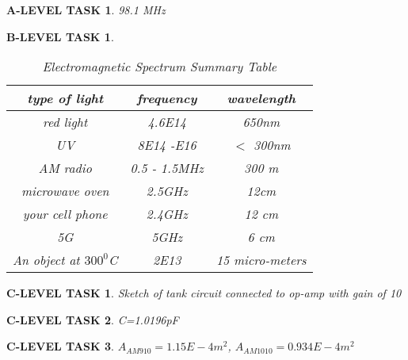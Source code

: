 \documentclass{book}
\numberwithin{equation}{section}
\newtheorem{alevel}{A-LEVEL TASK}
\newtheorem{blevel}{B-LEVEL TASK}
\newtheorem{clevel}{C-LEVEL TASK}
\theoremstyle{definition}
\begin{document}
\begin{alevel} 98.1 MHz \end{alevel}
\begin{blevel}  

\begin{table}[H]
\begin{center}
\begin{tabular}{c|c|c}
type of light&frequency&wavelength\\ \hline
red light& 4.6E14 &650nm \\ \hline
UV&8E14 -E16& $<$ 300nm \\ \hline
AM radio&0.5 - 1.5MHz&300 m \\ \hline
microwave oven&2.5GHz&12cm \\ \hline
your cell phone&2.4GHz&12 cm \\ \hline
5G&5GHz& 6 cm\\ \hline
An object at $300^0$C&2E13& 15 micro-meters \\ \hline
\end{tabular}
\caption{Electromagnetic Spectrum Summary Table}
\label{T:9L}
\end{center}
\end{table}

\end{blevel}
\begin{clevel} Sketch of tank circuit connected to op-amp with gain of 10 \end{clevel}
\begin{clevel} C=1.0196pF \end{clevel}
\begin{clevel} $A_{AM910}=1.15E-4 m^2$, $A_{AM1010}=0.934E-4 m^2$ \end{clevel}
\end{document}
